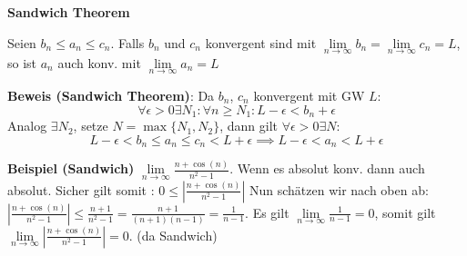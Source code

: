 \documentclass[25pt]{sciposter}
\newcommand{\limm}{\lim\limits_{n \to \infty}}
\newenvironment{method}[1]{\begin{mdframed}[backgroundcolor=blue!10,innertopmargin=15pt, innerbottommargin=15pt, nobreak=true]
		\textbf{#1 }
	}
	{ 
	\end{mdframed}
}
\begin{document}
\begin{multicols}{3}
\begin{method}{Sandwich Theorem}
Seien $b_n \leq a_n \leq c_n$. Falls $b_n$ und $c_n$ konvergent sind mit $\lim \limits_{n \to \infty } b_n = \lim \limits_{n \to \infty } c_n = L$, so ist $a_n$ auch konv. mit $\lim \limits_{n \to \infty } a_n = L$
\end{method}
\textbf{Beweis (Sandwich Theorem)}: 
Da $b_n$, $c_n$ konvergent mit GW $L$:
$$\forall \epsilon > 0 \exists N_1 : \forall n \geq N_1 : L-\epsilon < b_n + \epsilon$$
Analog  $ \exists N_2$, setze $N = \max\{N_1, N_2\}$, dann gilt $\forall \epsilon > 0 \exists N$:
$$L-\epsilon < b_n \leq a_n \leq c_n < L + \epsilon \implies L - \epsilon < a_n < L + \epsilon$$


\textbf{Beispiel (Sandwich)}
$\limm \frac{n + \cos(n)}{n^2 -1}$. Wenn es absolut konv. dann auch absolut. Sicher gilt somit : $0 \leq \left|\frac{n + \cos(n)}{n^2 -1}\right|$ Nun schätzen wir nach oben ab: $\left|\frac{n + \cos(n)}{n^2 -1}\right| \leq \frac{n+1}{n^2 - 1} = \frac{n+1}{(n+1)(n-1)} = \frac{1}{n-1}$. Es gilt $\limm \frac{1}{n-1} = 0$, somit gilt $\limm \left|\frac{n + \cos(n)}{n^2 -1}\right| = 0$. (da Sandwich)


\end{multicols}
\end{document}
